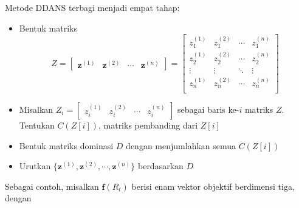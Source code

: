 Metode DDANS terbagi menjadi empat tahap: 
\begin{itemize}
  \item Bentuk matriks 
  \begin{equation}
    Z = 
    \begin{bmatrix}
      \mathbf{z}^{(1)} & \mathbf{z}^{(2)} & \cdots & \mathbf{z}^{(n)}
    \end{bmatrix}
    = 
    \begin{bmatrix}
      z^{(1)}_1 & z^{(2)}_1 & \cdots & z^{(n)}_1 \\
      z^{(1)}_2 & z^{(2)}_2 & \cdots & z^{(n)}_2 \\
      \vdots & \vdots & \ddots & \vdots \\
      z^{(1)}_n & z^{(2)}_n & \cdots & z^{(n)}_n \\
    \end{bmatrix}
  \end{equation}

  \item Misalkan $Z_i = \begin{bmatrix}z_i^{(1)} & z_i^{(2)} & \cdots & z_i^{(n)}\end{bmatrix}$ sebagai baris ke-$i$ matriks $Z$. Tentukan $C(Z[i])$, matriks pembanding dari $Z[i]$

  \item Bentuk matriks dominasi $D$ dengan menjumlahkan semua $C(Z[i])$

  \item Urutkan $\{\mathbf{z}^{(1)}, \mathbf{z}^{(2)}, \cdots, \mathbf{z}^{(n)}\}$ berdasarkan $D$
\end{itemize}

Sebagai contoh, misalkan $\mathbf{f}(R_t)$ berisi enam vektor objektif berdimensi tiga, dengan 

